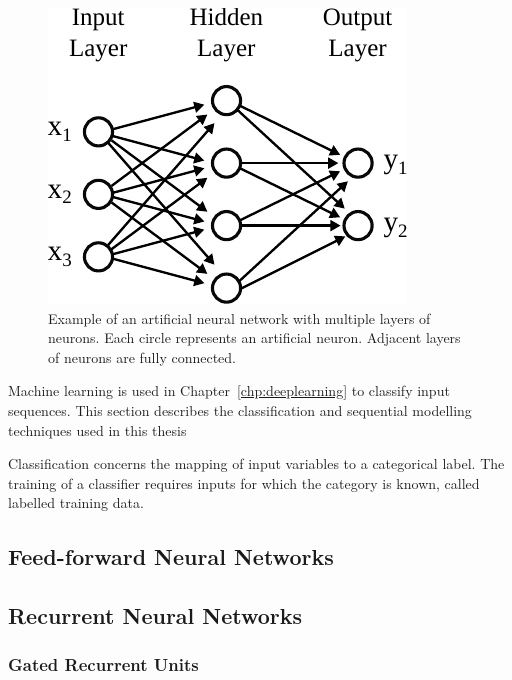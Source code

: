 \begin{figure}[h]
  \centering
  \includegraphics[scale=0.85]{src/background/figs/ML-feed-forward-network.pdf}
  \caption{Example of an artificial neural network with multiple layers of neurons. Each circle represents an artificial neuron. Adjacent layers of neurons are fully connected.}
  \label{fig:ML-feed-forward-network}
\end{figure}

Machine learning is used in Chapter~\ref{chp:deeplearning} to classify input sequences.
This section describes the classification and sequential modelling techniques used in this thesis

Classification concerns the mapping of input variables to a categorical label.
The training of a classifier requires inputs for which the category is known, called labelled training data.



\subsection{Feed-forward Neural Networks}

\subsection{Recurrent Neural Networks}

\subsubsection{Gated Recurrent Units}
